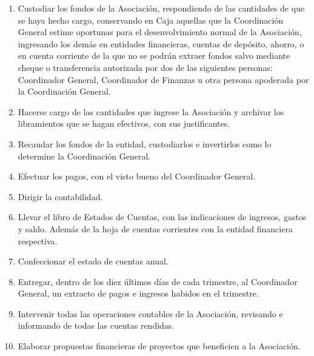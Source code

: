         \begin{enumerate}
          \item
            Custodiar los fondos de la Asociaci\'on, respondiendo de las
            cantidades de que se haya hecho cargo, conservando en Caja aquellas
            que la Coordinaci\'on General estime oportunas para el
            desenvolvimiento normal de la Asociaci\'on, ingresando los dem\'as
            en entidades financieras, cuentas de dep\'osito, ahorro, o en cuenta
            corriente de la que no se podr\'an extraer fondos salvo mediante
            cheque o transferencia autorizada por dos de las siguientes
            personas: Coordinador General, Coordinador de Finanzas u otra
            persona apoderada por la Coordinaci\'on General. 
            
          \item
            Hacerse cargo de las cantidades que ingrese la Asociaci\'on y
            archivar los libramientos que se hagan efectivos, con sus
            justificantes. 
            
          \item
            Recaudar los fondos de la entidad, custodiarlos e invertirlos como
            lo determine la Coordinaci\'on General. 
            
          \item
            Efectuar los pagos, con el visto bueno del Coordinador General. 
            
          \item
            Dirigir la contabilidad. 
            
          \item
            Llevar el libro de Estados de Cuentas, con las indicaciones de
            ingresos, gastos y saldo. Adem\'as de la hoja de cuentas corrientes
            con la entidad financiera respectiva. 
            
          \item
            Confeccionar el estado de cuentas anual. 
            
          \item
            Entregar, dentro de los diez \'ultimos d\'i{}as de cada trimestre,
            al Coordinador General, un extracto de pagos e ingresos habidos en
            el trimestre. 
          
          \item
            Intervenir todas las operaciones contables de la Asociaci\'on,
            revisando e informando de todas las cuentas rendidas.

          \item
            Elaborar propuestas financieras de proyectos que beneficien a la
            Asociaci\'on.

        \end{enumerate}
        
